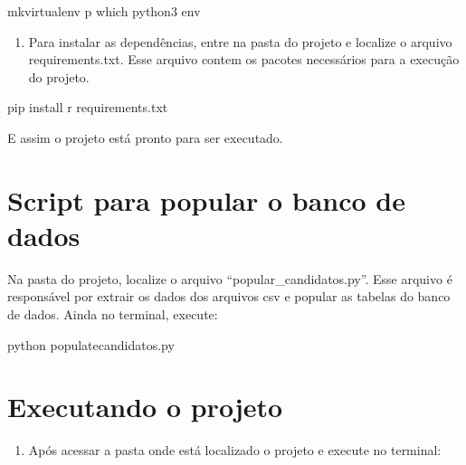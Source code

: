 \documentclass[letterpaper,10pt,portuges]{sphinxmanual}
\begin{document}
%
\begin{sphinxVerbatim}[commandchars=\\\{\}]
\PYGZdl{} mkvirtualenv \PYGZhy{}p which python3 env
\end{sphinxVerbatim}
\begin{enumerate}
\def\theenumi{\arabic{enumi}}
\def\labelenumi{\theenumi .}
\makeatletter\def\p@enumii{\p@enumi \theenumi .}\makeatother
\setcounter{enumi}{1}
\item {} 
Para instalar as dependências, entre na pasta do projeto e localize o arquivo requirements.txt. Esse arquivo contem os pacotes necessários para a execução do projeto.

\end{enumerate}

%
\begin{sphinxVerbatim}[commandchars=\\\{\}]
\PYGZdl{} pip install \PYGZhy{}r requirements.txt
\end{sphinxVerbatim}

E assim o projeto está pronto para ser executado.


\chapter{Script para popular o banco de dados}
\label{\detokenize{popular_banco:script-para-popular-o-banco-de-dados}}\label{\detokenize{popular_banco::doc}}
Na pasta do projeto, localize o arquivo “popular\_candidatos.py”. Esse arquivo é responsável por extrair os dados dos arquivos csv e popular as tabelas do banco de dados. Ainda no terminal, execute:

%
\begin{sphinxVerbatim}[commandchars=\\\{\}]
\PYGZdl{} python populate\PYGZus{}candidatos.py
\end{sphinxVerbatim}


\chapter{Executando o projeto}
\label{\detokenize{executar_projeto:executando-o-projeto}}\label{\detokenize{executar_projeto::doc}}\begin{enumerate}
\def\theenumi{\arabic{enumi}}
\def\labelenumi{\theenumi .}
\makeatletter\def\p@enumii{\p@enumi \theenumi .}\makeatother
\item {} 
Após acessar a pasta onde está localizado o projeto e execute no terminal:

\end{enumerate}
\end{document}
